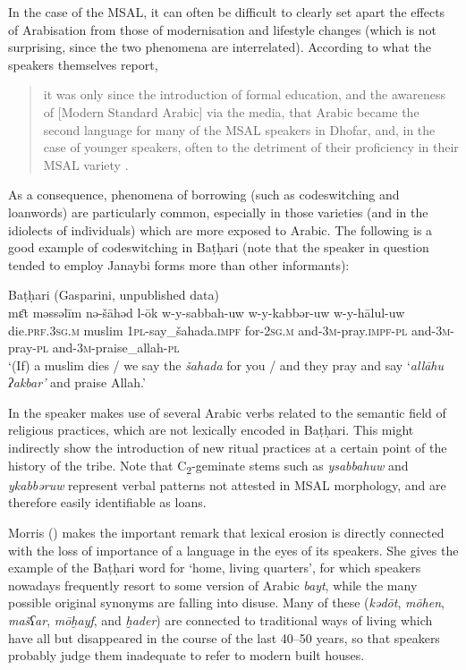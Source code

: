 \documentclass[output=paper]{langsci/langscibook}
\begin{document}
In the case of the MSAL, it can often be difficult to clearly set apart the effects of Arabisation from those of modernisation and lifestyle changes (which is not surprising, since the two phenomena are interrelated). According to what the speakers themselves report, 

\begin{quote}
{it was only since the introduction of formal education, and the awareness of} [Modern Standard Arabic] via the media, that Arabic became the second language for many of the MSAL speakers in Dhofar, and, in the case of younger speakers, often to the detriment of their proficiency in their MSAL variety \citep[11]{Davey2016}.
\end{quote}

As a consequence, phenomena of borrowing (such as codeswitching and loanwords) are particularly common, especially in those varieties (and in the idiolects of individuals) which are more exposed to Arabic. The following is a good example of codeswitching in Baṭḥari (note that the speaker in question tended to employ Janaybi forms more than other informants):

\ea\label{ex:key:allah}
{Baṭḥari (Gasparini, unpublished data)}\\
\gll mɛ̄t məssəlīm nə-šāhəd l-ōk w-y-sabbah-uw w-y-kabbər-uw w-y-hālul-uw\\
     die.\textsc{prf.3sg.m} muslim \textsc{1pl-}say\_šahada.\textsc{impf} for-\textsc{2sg.m} and-\textsc{3m-}pray.\textsc{impf-pl} and-3\textsc{m}-pray-\textsc{pl} and-\textsc{3m-}praise\_allah-\textsc{pl}\\
\glt `(If) a muslim dies / we say the \textit{šahada} for you / and they pray and say ‘\textit{allāhu} \textit{ʔakbar’} and praise Allah.'
\z

In  the speaker makes use of several Arabic verbs related to the semantic field of religious practices, which are not lexically encoded in Baṭḥari. This might indirectly show the introduction of new ritual practices at a certain point of the history of the tribe. Note that C\textsubscript{2}-geminate stems such as \textit{ysabbahuw} and \mbox{\textit{ykabbəruw}} represent verbal patterns not attested in MSAL morphology, and are therefore easily identifiable as loans.

Morris (\citeyear[15]{Morris2017}) makes the important remark that lexical erosion is directly connected with the loss of importance of a language in the eyes of its speakers. She gives the example of the Baṭḥari word for ‘home, living quarters’, for which speakers nowadays frequently resort to some version of Arabic \textit{bayt}, while the many possible original synonyms are falling into disuse. Many of these (\textit{kədōt}, \textit{mōhen}, \textit{mašʕar}, \textit{mōḫayf}, and \textit{ḫader}) are connected to traditional ways of living which have all but disappeared in the course of the last 40--50 years, so that speakers probably judge them inadequate to refer to modern built houses. 
\end{document}
